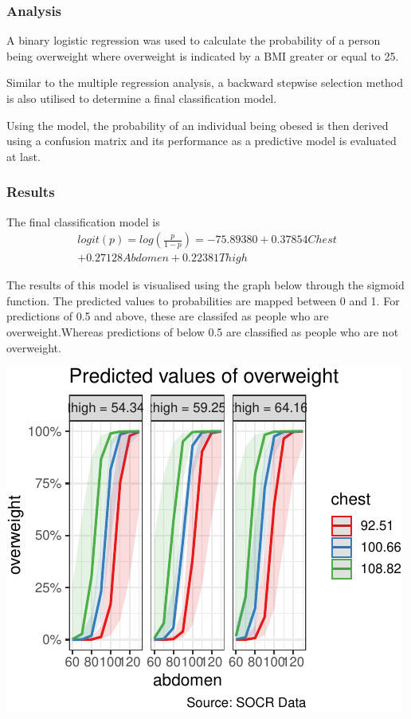 \documentclass[a4paper,9pt,twocolumn,twoside,]{pinp}
\begin{document}
\hypertarget{analysis-2}{%
\subsubsection{Analysis}\label{analysis-2}}

A binary logistic regression was used to calculate the probability of a
person being overweight where overweight is indicated by a BMI greater
or equal to 25.

Similar to the multiple regression analysis, a backward stepwise
selection method is also utilised to determine a final classification
model.

Using the model, the probability of an individual being obesed is then
derived using a confusion matrix and its performance as a predictive
model is evaluated at last.

\hypertarget{results-1}{%
\subsubsection{Results}\label{results-1}}

The final classification model is \[
\begin{aligned}
logit(p)=log(\frac{p}{1-p})=-75.89380+0.37854Chest\\ +0.27128Abdomen+0.22381Thigh
\end{aligned}
\]

The results of this model is visualised using the graph below through
the sigmoid function. The predicted values to probabilities are mapped
between 0 and 1. For predictions of 0.5 and above, these are classifed
as people who are overweight.Whereas predictions of below 0.5 are
classified as people who are not overweight.

\begin{center}\includegraphics{Executive_Report_files/figure-latex/unnamed-chunk-2-1} \end{center}
\end{document}
